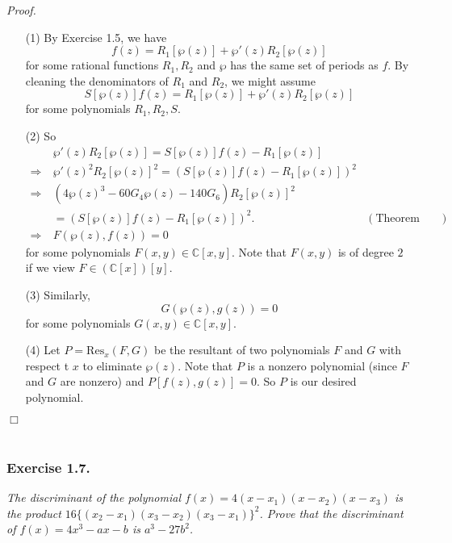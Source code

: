 \documentclass{article}
\begin{document}
\emph{Proof.}
\begin{enumerate}
\item[(1)]
  By Exercise 1.5, we have
  \[
    f(z) = R_1[\wp(z)] + \wp'(z) R_2[\wp(z)]
  \]
  for some rational functions $R_1, R_2$
  and $\wp$ has the same set of periods as $f$.
  By cleaning the denominators of $R_1$ and $R_2$,
  we might assume
  \[
    S[\wp(z)] f(z) = R_1[\wp(z)] + \wp'(z) R_2[\wp(z)]
  \]
  for some polynomials $R_1, R_2, S$.

\item[(2)]
  So
  \begin{align*}
    &\:
    \wp'(z) R_2[\wp(z)] = S[\wp(z)] f(z) - R_1[\wp(z)] \\
    \Longrightarrow &\:
    \wp'(z)^2 R_2[\wp(z)]^2 = (S[\wp(z)] f(z) - R_1[\wp(z)])^2 \\
    \Longrightarrow &\:
    (4 \wp(z)^3 - 60G_4 \wp(z) -  140G_6) R_2[\wp(z)]^2 \\
    &\: = (S[\wp(z)] f(z) - R_1[\wp(z)])^2.
      &(\text{Theorem 1.12}) \\
    \Longrightarrow &\:
    F(\wp(z), f(z)) = 0
  \end{align*}
  for some polynomials $F(x,y) \in \mathbb{C}[x,y]$.
  Note that $F(x,y)$ is of degree $2$ if we view $F \in (\mathbb{C}[x])[y]$.

\item[(3)]
  Similarly,
  \[
    G(\wp(z), g(z)) = 0
  \]
  for some polynomials $G(x,y) \in \mathbb{C}[x,y]$.

\item[(4)]
  Let $P = \mathrm{Res}_{x}(F, G)$ be
  the resultant of two polynomials $F$ and $G$ with respect t $x$ to eliminate $\wp(z)$.
  Note that $P$ is a nonzero polynomial (since $F$ and $G$ are nonzero)
  and $P[f(z),g(z)] = 0$.
  So $P$ is our desired polynomial.
\end{enumerate}
$\Box$ \\\\






\subsubsection*{Exercise 1.7.}
\emph{The discriminant of the polynomial $f(x) = 4(x-x_1)(x-x_2)(x-x_3)$
is the product $16 \{(x_2-x_1)(x_3-x_2)(x_3-x_1)\}^2$.
Prove that the discriminant of $f(x) = 4x^3 - ax - b$ is $a^3 - 27b^2$.} \\
\end{document}
